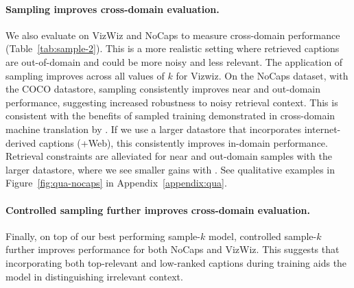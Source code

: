 \paragraph*{Sampling improves cross-domain evaluation.} We also evaluate on VizWiz and NoCaps to measure cross-domain performance (Table~\ref{tab:sample-2}). This is a more realistic setting where retrieved captions are out-of-domain and could be more noisy and less relevant. The application of sampling improves across all values of $k$ for Vizwiz. On the NoCaps dataset, with the COCO datastore, sampling consistently improves near and out-domain performance, suggesting increased robustness to noisy retrieval context.  This is consistent with the benefits of sampled training demonstrated in cross-domain machine translation by \citet{hoang2022improving}. If we use a larger datastore that incorporates internet-derived captions (+Web), this consistently improves in-domain performance. Retrieval constraints are alleviated for near and out-domain samples with the larger datastore, where we see smaller gains with . See qualitative examples in Figure~\ref{fig:qua-nocaps} in Appendix~\ref{appendix:qua}.


\paragraph*{Controlled sampling further improves cross-domain evaluation.} Finally, on top of our best performing sample-$k$ model, controlled sample-$k$ further improves performance for both NoCaps and VizWiz. This suggests that incorporating both top-relevant and low-ranked captions during training aids the model in distinguishing irrelevant context.



